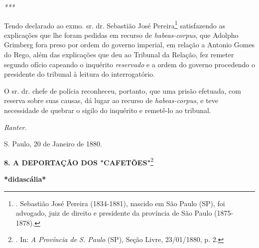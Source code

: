\emph{***}

Tendo declarado ao exmo. sr. dr. Sebastião José Pereira\footnote{.
  Sebastião José Pereira (1834-1881), nascido em São Paulo (SP), foi
  advogado, juiz de direito e presidente da província de São Paulo
  (1875-1878).}
satisfazendo as explicações
que lhe foram pedidas em recurso de \emph{habeas-corpus}, que Adolpho
Grimberg fora preso por ordem do governo imperial, em relação a Antonio
Gomes do Rego, além das explicações que deu ao Tribunal da Relação, fez
remeter segundo ofício capeando o inquérito \emph{reservado} e a ordem
do governo procedendo o presidente do tribunal à leitura do
interrogatório.

O sr. dr. chefe de polícia reconheceu, portanto, que uma prisão
efetuada, com reserva sobre suas causas, dá lugar ao recurso de
\emph{habeas-corpus}, e teve necessidade de quebrar o sigilo do
inquérito e remetê-lo ao tribunal.

\emph{Ranter.}

S. Paulo, 20 de Janeiro de 1880.

\textbf{8. A DEPORTAÇÃO DOS "CAFETÕES"}\footnote{. In: \emph{A Província
  de S. Paulo} (SP), Seção Livre, 23/01/1880, p. 2.}

\textbf{*didascália*}

